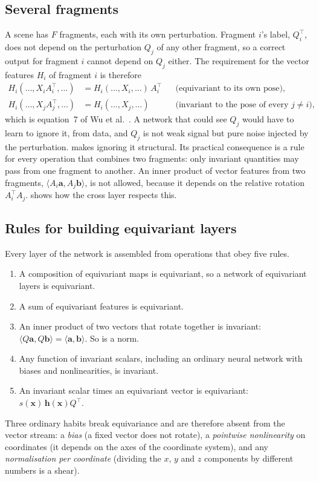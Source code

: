 \documentclass[11pt,a4paper]{article}
\theoremstyle{remark}
\newcommand{\x}{\mathbf{x}}
\newcommand{\T}{^{\top}}
\newcommand{\ip}[2]{\langle #1,#2\rangle}
\begin{document}
\subsection{Several fragments}
\label{sec:multi}
A scene has $F$ fragments, each with its own perturbation. Fragment $i$'s label, $Q_i\T$, does not depend on the perturbation $Q_j$ of any other fragment, so a correct output for fragment $i$ cannot depend on $Q_j$ either. The requirement for the vector features $H_i$ of fragment $i$ is therefore
\begin{equation}
  \begin{aligned}
  H_i(\dots,X_iA_i\T,\dots)&=H_i(\dots,X_i,\dots)\,A_i\T &&\text{(equivariant to its own pose),}\\
  H_i(\dots,X_jA_j\T,\dots)&=H_i(\dots,X_j,\dots) &&\text{(invariant to the pose of every $j\ne i$),}
  \end{aligned}
  \label{eq:multi}
\end{equation}
which is equation~7 of Wu et al.~\cite{wu2023leveraging}. A network that could see $Q_j$ would have to learn to ignore it, from data, and $Q_j$ is not weak signal but pure noise injected by the perturbation.  makes ignoring it structural. Its practical consequence is a rule for every operation that combines two fragments: only invariant quantities may pass from one fragment to another. An inner product of vector features from two fragments, $\ip{A_i\mathbf a}{A_j\mathbf b}$, is not allowed, because it depends on the relative rotation $A_i\T A_j$.  shows how the cross layer respects this.

\subsection{Rules for building equivariant layers}
\label{sec:rules}
Every layer of the network is assembled from operations that obey five rules.
\begin{enumerate}
  \item A composition of equivariant maps is equivariant, so a network of equivariant layers is equivariant.
  \item A sum of equivariant features is equivariant.
  \item An inner product of two vectors that rotate together is invariant: $\ip{Q\mathbf a}{Q\mathbf b}=\ip{\mathbf a}{\mathbf b}$. So is a norm.
  \item Any function of invariant scalars, including an ordinary neural network with biases and nonlinearities, is invariant.
  \item An invariant scalar times an equivariant vector is equivariant: $s(\x)\,\mathbf h(\x)Q\T$.
\end{enumerate}
Three ordinary habits break equivariance and are therefore absent from the vector stream: a \emph{bias} (a fixed vector does not rotate), a \emph{pointwise nonlinearity} on coordinates (it depends on the axes of the coordinate system), and any \emph{normalisation per coordinate} (dividing the $x$, $y$ and $z$ components by different numbers is a shear).
\end{document}
